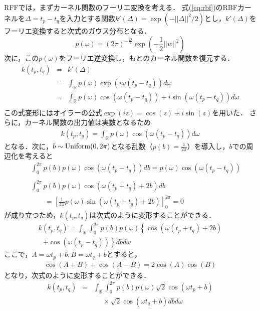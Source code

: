 \documentclass[conference]{IEEEtran}
\begin{document}
RFFでは，まずカーネル関数のフーリエ変換を考える．
式(\ref{eq:rbf})のRBFカーネルを$\Delta = t_p - t_q$を入力とする関数$k'(\Delta)=\exp( -||\Delta||^2/2 )$とし，$k'(\Delta)$をフーリエ変換すると次式のガウス分布となる．
%
\begin{equation}
p(\omega) = (2 \pi)^{-\frac{D}{2}} \exp(-\frac{1}{2}||w||^2)
\end{equation}
%
次に，この$p(\omega)$をフーリエ逆変換し，もとのカーネル関数を復元する．
%
\begin{eqnarray}
k(t_p,t_q) &=& k'(\Delta) \\
&=& \int_\mathbb{R} p(\omega) \exp( i \omega (t_p - t_q) ) d \omega \\
&=& \int_\mathbb{R} p(\omega)\cos(\omega (t_p - t_q)) + i \sin(\omega (t_p - t_q)) d \omega \nonumber \\
\end{eqnarray}
%
この式変形にはオイラーの公式$\exp(iz) = \cos(z) + i \sin(z)$を用いた．
さらに，カーネル関数の出力値は実数となるため
%
\begin{eqnarray}
k(t_p,t_q) = \int_\mathbb{R} p(\omega)\cos(\omega (t_p - t_q)) d \omega 
\end{eqnarray}
%
となる．次に，$b \sim {\rm Uniform}(0, 2 \pi)$となる乱数（$p(b) = \frac{1}{2 \pi}$）を導入し，$b$での周辺化を考えると
%
\begin{eqnarray}
&&\int_0^{2 \pi} p(b) p(\omega)\cos(\omega (t_p - t_q)) d b = p(\omega)\cos(\omega (t_p - t_q)) \nonumber \\ \\
&&\int_0^{2 \pi} p(b) p(\omega)\cos(\omega (t_p + t_q) + 2 b) d b \\
&&~~~~~~~~~= \left[ \frac{1}{4 \pi} p(\omega)\sin(\omega (t_p + t_q) + 2 b)  \right]_0^{2 \pi}=0 
\end{eqnarray}
%
が成り立つため，$k(t_p,t_q)$は次式のように変形することができる．
%
\begin{eqnarray}
k(t_p,t_q) = \int_\mathbb{R} \int_0^{2 \pi} p(b) p(\omega) \left\{ \cos(\omega (t_p + t_q) + 2 b) \right. \nonumber \\
~~~ \left. +\cos(\omega (t_p - t_q)) \right\} db d \omega 
\end{eqnarray}
%
ここで，$A=\omega t_p +b, B = \omega t_q +b $とすると，
%
\begin{eqnarray}
\cos(A+B) + \cos(A-B)= 2 \cos(A)\cos(B)
\end{eqnarray}
%
となり，次式のように変形することができる．
%
\begin{eqnarray}
k(t_p,t_q) &=& \int_\mathbb{R} \int_0^{2 \pi} p(b) p(\omega) \sqrt{2} \cos(\omega t_p +b) \nonumber \\
&&~~~~~~ \times \sqrt{2} \cos(\omega t_q +b) db d \omega 
\end{eqnarray}
\end{document}
